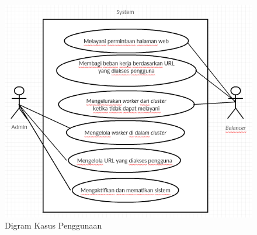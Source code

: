 \documentclass{ta-its}
\begin{document}
		    \begin{figure}[h] %
		    	\centering
		    	\includegraphics[width=\linewidth]{contoh_img/usecase}
		    	\caption{Digram Kasus Penggunaan}
		    	\label{gambarDiagramKasusPenggunaan}
		    \end{figure}
		    
\end{document}
